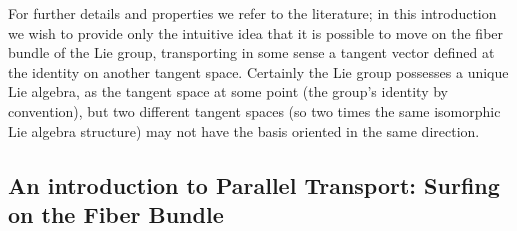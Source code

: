 For further details and properties we refer to the literature; in this introduction we wish to provide only the intuitive idea that it is possible to move on the fiber bundle of the Lie group, transporting in some sense a tangent vector defined at the identity on another tangent space. Certainly the Lie group possesses a unique Lie algebra, as the tangent space at some point (the group's identity by convention), but two different tangent spaces (so two times the same isomorphic Lie algebra structure) may not have the basis oriented in the same direction. 

\subsection{An introduction to Parallel Transport: Surfing on the Fiber Bundle}\label{se:parallel_transport}

